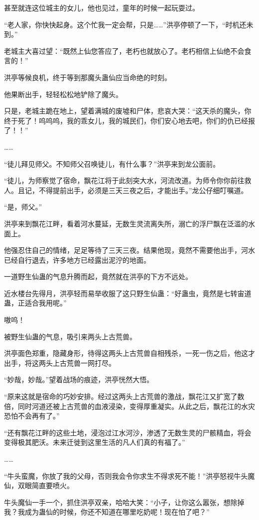 \begin{this_body}
甚至就连这位城主的女儿，他也见过，童年的时候一起玩耍过。

“老人家，你快快起身。这个忙我一定会帮，只是……”洪亭停顿了一下，“时机还未到。”

老城主大喜过望：“既然上仙您答应了，老朽也就放心了。老朽相信上仙绝不会食言的！”

洪亭等候良机，终于等到那魔头蛊仙应当命绝的时刻。

他果断出手，轻轻松松地铲除了魔头。

只是，老城主跪在地上，望着满城的废墟和尸体，悲哀大哭：“这天杀的魔头，你终于死了！呜呜呜，我的乖女儿，我的城民们，你们安心地去吧，你们的仇已经报了！！”

……

“徒儿拜见师父。不知师父召唤徒儿，有什么事？”洪亭来到龙公面前。

“徒儿，为师察觉了宿命，飘花江将于此刻突大水，河流改道。为师令你你前往救人。且记，不得提前出手，必须是三天三夜之后，才能出手。”龙公仔细叮嘱道。

“是，师父。”

洪亭来到飘花江畔，看着河水蔓延，无数生灵流离失所，溺亡的浮尸飘在泛滥的水面上。

他强忍住自己的情绪，足足等待了三天三夜。结果他现，竟然不需要他出手，河水已经自行退去，许多地方已经露出泥泞的地面。

一道野生仙蛊的气息升腾而起，竟然就在洪亭的下方不远处。

近水楼台先得月，洪亭轻而易举收服了这只野生仙蛊：“好蛊虫，竟然是七转宙道蛊，正适合我用呢。”

嗷呜！

被野生仙蛊的气息，吸引来两头上古荒兽。

洪亭面色郑重，隐藏身形，待得这两头上古荒兽自相残杀，一死一伤之后，他这才出手，将这两头上古荒兽一网打尽。

“妙哉，妙哉。”望着战场的痕迹，洪亭恍然大悟。

“原来这就是宿命的巧妙安排。经过这两头上古荒兽的激战，飘花江又扩宽了数倍，同时河道还被上古荒兽的血液浸染，变得厚重凝实。从此之后，飘花江的水灾恐怕不会再有了。”

“还有飘花江畔的这些土地，浸泡过江水河沙，渗透了无数生灵的尸骸精血，将会变得极其肥沃。未来迁徙到这里生活的凡人们真的有福了。”

……

“牛头蛮魔，你放了我的父母，否则我会令你求生不得求死不能！”洪亭怒视牛头魔仙，双眼简直要喷火。

牛头魔仙一手一个，抓住洪亭双亲，哈哈大笑：“小子，让你这么嚣张，想除掉我？我成为蛊仙的时候，你还不知道在哪里吃奶呢！现在怕了吧？”


\end{this_body}
